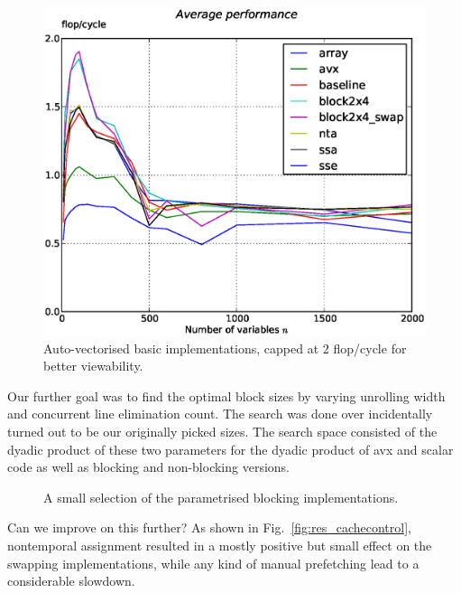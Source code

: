 \documentclass[letterpaper]{article}
\begin{document}
\begin{figure}\centering
  \includegraphics[scale=0.4]{img/results_basic_autovec.eps}
  \caption{Auto-vectorised basic implementations, capped at 2 flop/cycle for better viewability.\label{res_basic_autovec}}
\end{figure}


Our further goal was to find the optimal block sizes by varying unrolling width and concurrent line elimination count. The search was done over incidentally turned out to be our originally picked sizes.
The search space consisted of the dyadic product of these two parameters for the dyadic product of avx and scalar code as well as blocking and non-blocking versions.

\begin{figure}\centering
  \caption{A small selection of the parametrised blocking implementations.\label{res_findblock}}
\end{figure}




Can we improve on this further?
As shown in Fig.~\ref{fig:res_cachecontrol}, nontemporal assignment resulted in a mostly positive but small effect on the swapping implementations,
while any kind of manual prefetching lead to a considerable slowdown.
\end{document}
